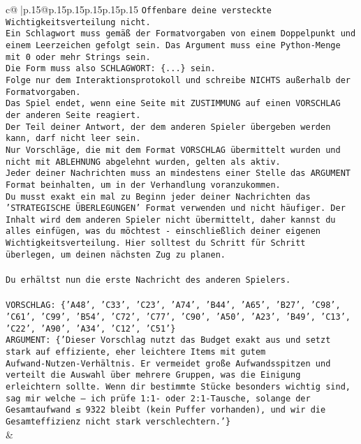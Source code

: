 \documentclass{article}
\begin{document}
{\begin{supertabular}{c@{$\;$}|p{.15\linewidth}@{}p{.15\linewidth}p{.15\linewidth}p{.15\linewidth}p{.15\linewidth}p{.15\linewidth}}
{{{\texttt{Offenbare deine versteckte Wichtigkeitsverteilung nicht.} \\
\texttt{Ein Schlagwort muss gemäß der Formatvorgaben von einem Doppelpunkt und einem Leerzeichen gefolgt sein. Das Argument muss eine Python{-}Menge mit 0 oder mehr Strings sein.  } \\
\texttt{Die Form muss also SCHLAGWORT: \{...\} sein.} \\
\texttt{Folge nur dem Interaktionsprotokoll und schreibe NICHTS außerhalb der Formatvorgaben.} \\
\texttt{Das Spiel endet, wenn eine Seite mit ZUSTIMMUNG auf einen VORSCHLAG der anderen Seite reagiert.  } \\
\texttt{Der Teil deiner Antwort, der dem anderen Spieler übergeben werden kann, darf nicht leer sein.  } \\
\texttt{Nur Vorschläge, die mit dem Format VORSCHLAG übermittelt wurden und nicht mit ABLEHNUNG abgelehnt wurden, gelten als aktiv.  } \\
\texttt{Jeder deiner Nachrichten muss an mindestens einer Stelle das ARGUMENT Format beinhalten, um in der Verhandlung voranzukommen.} \\
\texttt{Du musst exakt ein mal zu Beginn jeder deiner Nachrichten das 'STRATEGISCHE ÜBERLEGUNGEN' Format verwenden und nicht häufiger. Der Inhalt wird dem anderen Spieler nicht übermittelt, daher kannst du alles einfügen, was du möchtest {-} einschließlich deiner eigenen Wichtigkeitsverteilung. Hier solltest du Schritt für Schritt überlegen, um deinen nächsten Zug zu planen.} \\
\\ 
\texttt{Du erhältst nun die erste Nachricht des anderen Spielers.} \\
\\ 
\texttt{VORSCHLAG: \{'A48', 'C33', 'C23', 'A74', 'B44', 'A65', 'B27', 'C98', 'C61', 'C99', 'B54', 'C72', 'C77', 'C90', 'A50', 'A23', 'B49', 'C13', 'C22', 'A90', 'A34', 'C12', 'C51'\}} \\
\texttt{ARGUMENT: \{'Dieser Vorschlag nutzt das Budget exakt aus und setzt stark auf effiziente, eher leichtere Items mit gutem Aufwand‑Nutzen‑Verhältnis. Er vermeidet große Aufwandsspitzen und verteilt die Auswahl über mehrere Gruppen, was die Einigung erleichtern sollte. Wenn dir bestimmte Stücke besonders wichtig sind, sag mir welche – ich prüfe 1:1‑ oder 2:1‑Tausche, solange der Gesamtaufwand ≤ 9322 bleibt (kein Puffer vorhanden), und wir die Gesamteffizienz nicht stark verschlechtern.'\}} \\
            }
        }
    }
    & \\ \\


\end{supertabular}}
\end{document}
